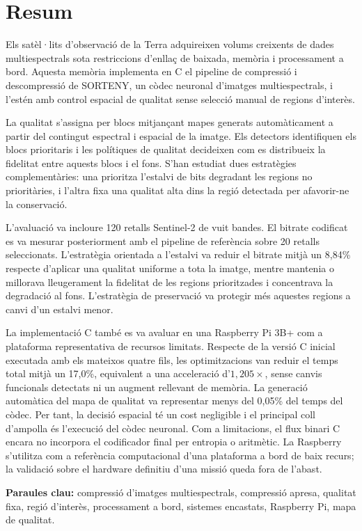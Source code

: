 \chapter*{Resum\label{Resum}}

Els satèl·lits d'observació de la Terra adquireixen volums creixents de dades
multiespectrals sota restriccions d'enllaç de baixada, memòria i processament a
bord. Aquesta memòria implementa en C el pipeline de compressió i descompressió
de SORTENY, un còdec neuronal d'imatges multiespectrals, i l'estén amb control
espacial de qualitat sense selecció manual de regions d'interès.

La qualitat s'assigna per blocs mitjançant mapes generats automàticament a partir
del contingut espectral i espacial de la imatge. Els detectors identifiquen els
blocs prioritaris i les polítiques de qualitat decideixen com es distribueix la
fidelitat entre aquests blocs i el fons. S'han estudiat dues estratègies
complementàries: una prioritza l'estalvi de bits degradant les regions no
prioritàries, i l'altra fixa una qualitat alta dins la regió detectada per
afavorir-ne la conservació.

L'avaluació va incloure 120 retalls Sentinel-2 de vuit bandes. El bitrate
codificat es va mesurar posteriorment amb el pipeline de referència sobre 20
retalls seleccionats. L'estratègia orientada a l'estalvi va reduir el bitrate
mitjà un 8,84\% respecte d'aplicar una qualitat uniforme a tota la imatge,
mentre mantenia o millorava lleugerament la fidelitat de les regions
prioritzades i concentrava la degradació al fons. L'estratègia de preservació va
protegir més aquestes regions a canvi d'un estalvi menor.

La implementació C també es va avaluar en una Raspberry Pi 3B+ com a plataforma
representativa de recursos limitats. Respecte de la versió C inicial executada
amb els mateixos quatre fils, les optimitzacions van reduir el temps total
mitjà un 17,0\%, equivalent a una acceleració d'$1,205\times$, sense canvis
funcionals detectats ni un augment rellevant de memòria. La generació automàtica
del mapa de qualitat va representar menys del 0,05\% del temps del còdec. Per
tant, la decisió espacial té un cost negligible i el principal coll d'ampolla
és l'execució del còdec neuronal. Com a limitacions, el flux binari C encara no
incorpora el codificador final per entropia o aritmètic. La Raspberry s'utilitza
com a referència computacional d'una plataforma a bord de baix recurs; la
validació sobre el hardware definitiu d'una missió queda fora de l'abast.

\textbf{Paraules clau:} compressió d'imatges multiespectrals, compressió
apresa, qualitat fixa, regió d'interès, processament a bord, sistemes encastats,
Raspberry Pi, mapa de qualitat.
